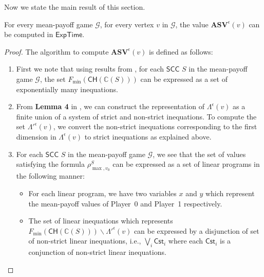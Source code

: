 Now we state the main result of this section.
\begin{theorem}
    For every mean-payoff game $\mathcal{G}$, for every vertex $v$ in $\mathcal{G}$, the value $\mathbf{ASV}^{\epsilon}(v)$ can be computed in $\mathsf{ExpTime}$.
\end{theorem}
\begin{proof}
The algorithm to compute $\mathbf{ASV}^{\epsilon}(v)$ is defined as follows:
\begin{enumerate}
    \item First we note that using 
    results from \cite{CDEHR10},
    for each $\mathsf{SCC}$ $S$ in the mean-payoff game $\mathcal{G}$, the set $F_{\min}(\mathsf{CH}(\mathbb{C}(S)))$ can be expressed as a set of exponentially many inequations.
    \item From \textbf{Lemma 4} in \cite{BR15}, we can construct the representation of $\Lambda^{\epsilon}(v)$ as a finite union of a system of strict and non-strict inequations. To compute the set $\Lambda'^{\epsilon}(v)$, we convert the non-strict inequations corresponding to the first dimension in $\Lambda^{\epsilon}(v)$ to strict inequations as explained above.
    \item For each $\mathsf{SCC}$ $S$ in the mean-payoff game $\mathcal{G}$, we see that the set of values satisfying the formula $\rho^S_{\max,v_0}$ can be expressed as a set of linear programs in the following manner: 
    \begin{itemize}
      \item For each linear program, we have two variables $x$ and $y$ which represent the mean-payoff values of Player~0 and Player~1 respectively.
      \item The set of linear inequations which represents $F_{\min}(\mathsf{CH}(\mathbb{C}(S))) \backslash \Lambda'^{\epsilon}(v)$ can be expressed by a disjunction of set of non-strict linear inequations, i.e., $\bigvee_i \mathsf{Cst}_i$ where each $\mathsf{Cst}_i$ is a conjunction of non-strict linear inequations.

\end{itemize}
\end{enumerate}
\end{proof}
